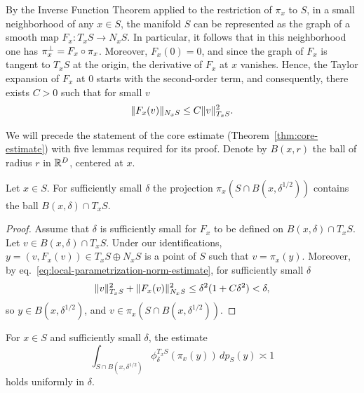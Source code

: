 By the Inverse Function Theorem applied to the restriction of $\pi_x$ to $S$, in a small neighborhood of any $x\in S$, the manifold $S$ can be represented as the graph of a smooth map $F_x\colon T_xS \to N_x S$. In particular, it follows that in this neighborhood one has $\pi^\perp_x = F_x \circ \pi_x$. Moreover, $F_x(0) = 0$, and since the graph of $F_x$ is tangent to $T_xS$ at the origin, the derivative of $F_x$ at $x$ vanishes. Hence, the Taylor expansion of $F_x$ at $0$ starts with the second-order term, and consequently, there exists $C>0$ such that for small $v$ 
\begin{equation}
\label{eq:local-parametrization-norm-estimate}
    \lVert{F_x(v)}\rVert_{N_xS} \leq C\lVert{v}\rVert_{T_xS}^2.
\end{equation}

We will precede the statement of the core estimate (Theorem~\ref{thm:core-estimate}) with five lemmas required for its proof. Denote by $B(x,r)$ the ball of radius $r$ in $\mathbb{R}^D$, centered at $x$. 

\begin{lemma}
\label{lem:ball-containment}
    Let $x\in S$. For sufficiently small $\delta$ the projection $\pi_x(S\cap B(x,\delta^{1/2}))$ contains the ball $B(x,\delta) \cap T_xS$. 
\end{lemma}

\begin{proof}
\label{lem:ball-containment-proof}
    Assume that $\delta$ is sufficiently small for $F_x$ to be defined on $B(x,\delta) \cap T_xS$. Let $v\in B(x,\delta) \cap T_xS$. Under our identifications, $y=(v,F_x(v)) \in T_xS \oplus N_xS$ is a point of $S$ such that $v=\pi_x(y)$. Moreover, by eq.~\eqref{eq:local-parametrization-norm-estimate}, for sufficiently small $\delta$
    \begin{equation}
        \lVert{v}\rVert^2_{T_xS} + \lVert{F_x(v)}\rVert^2_{N_xS} \leq \delta^2(1+ C\delta^2) < \delta,
    \end{equation}
    so $y\in B(x,\delta^{1/2})$, and $v \in \pi_x(S\cap B(x,\delta^{1/2}))$.
\end{proof}

\begin{lemma}
\label{lem:tangent-gaussian-estimate}
    For $x\in S$ and sufficiently small $\delta$, the estimate
    \begin{equation}
        \int_{S\cap B(x,\delta^{1/2})} \phi^{T_xS}_\delta(\pi_x(y))\,dp_S(y) \asymp 1
    \end{equation}
    holds uniformly in $\delta$.
\end{lemma}

